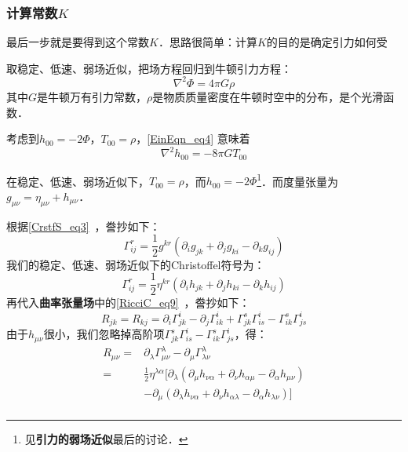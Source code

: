 \subsubsection{计算常数$K$}


最后一步就是要得到这个常数$K$．思路很简单：计算$K$的目的是确定引力如何受

取稳定、低速、弱场近似，把场方程回归到牛顿引力方程：
\begin{equation}\label{EinEqn_eq4}
\nabla^2\Phi=4\pi G\rho
\end{equation}
其中$G$是牛顿万有引力常数，$\rho$是物质质量密度在牛顿时空中的分布，是个光滑函数．

考虑到$h_{00}=-2\Phi$，$T_{00}=\rho$，\autoref{EinEqn_eq4} 意味着
\begin{equation}
\nabla^2h_{00}=-8\pi G T_{00}
\end{equation}





在稳定、低速、弱场近似下，$T_{00}=\rho$，而$h_{00}=-2\Phi$\footnote{见\textbf{引力的弱场近似}最后的讨论．}．而度量张量为$g_{\mu\nu}=\eta_{\mu\nu}+h_{\mu\nu}$．



根据\autoref{CrstfS_eq3}~，誊抄如下：
\begin{equation}
\Gamma^{r}_{ij}=\frac{1}{2}g^{kr}(\partial_ig_{jk}+\partial_jg_{ki}-\partial_kg_{ij})
\end{equation}
我们的稳定、低速、弱场近似下的Christoffel符号为：
\begin{equation}
\Gamma^{r}_{ij}=\frac{1}{2}\eta^{kr}(\partial_ih_{jk}+\partial_jh_{ki}-\partial_kh_{ij})
\end{equation}
再代入\textbf{曲率张量场}中的\autoref{RicciC_eq9}~，誊抄如下：
\begin{equation}
R_{jk}=R_{kj}=\partial_i\Gamma^i_{jk}-\partial_j\Gamma^{i}_{ik}+\Gamma^s_{jk}\Gamma^i_{is}-\Gamma^s_{ik}\Gamma^i_{js}
\end{equation}
由于$h_{\mu\nu}$很小，我们忽略掉高阶项$\Gamma^s_{jk}\Gamma^i_{is}-\Gamma^s_{ik}\Gamma^i_{js}$，得：
\begin{equation}
\begin{aligned}
R_{\mu\nu}=&\partial_\lambda\Gamma^\lambda_{\mu\nu}-\partial_{\mu}\Gamma^\lambda_{\lambda\nu}\\
=&\frac{1}{2}\eta^{\lambda\alpha}[\partial_\lambda(\partial_\mu h_{\nu \alpha}+\partial_\nu h_{\alpha\mu}-\partial_\alpha h_{\mu\nu})\\
&-\partial_\mu(\partial_\lambda h_{\nu\alpha}+\partial_\nu h_{\alpha\lambda}-\partial_\alpha h_{\lambda\nu})]\\
\end{aligned}
\end{equation}

